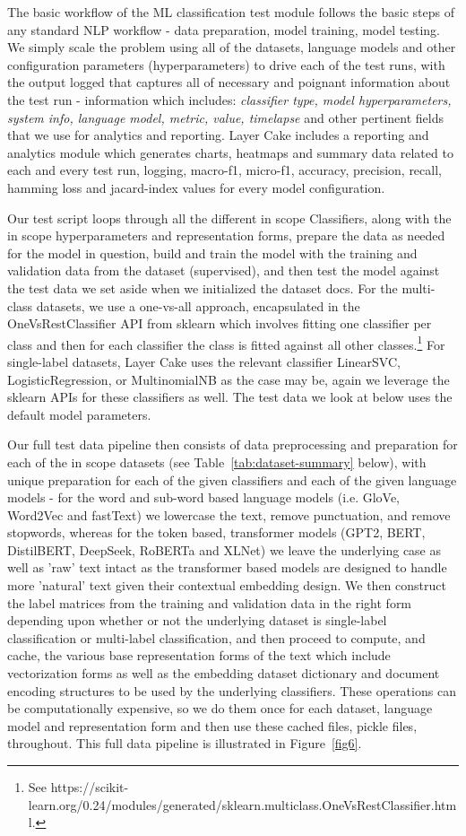 \documentclass[final]{clv2025-revised}
\begin{document}
The basic workflow of the ML classification test module follows the basic steps of any standard NLP workflow - data preparation, model training, model testing. We simply scale the problem using all of the datasets, language models and other configuration parameters (hyperparameters) to drive each of the test runs, with the output logged that captures all of necessary and poignant information about the test run - information which includes: \textit{classifier type, model hyperparameters, system info, language model, metric, value, timelapse} and other pertinent fields that we use for analytics and reporting. Layer Cake includes a reporting and analytics module which generates charts, heatmaps and summary data related to each and every test run, logging, macro-f1, micro-f1, accuracy, precision, recall, hamming loss and jacard-index values for every model configuration. 

Our test script loops through all the different in scope Classifiers, along with the in scope hyperparameters and representation forms, prepare the data as needed for the model in question, build and train the model with the training and validation data from the dataset (supervised), and then test the model against the test data we set aside when we initialized the dataset docs. For the multi-class datasets, we use a one-vs-all approach, encapsulated in the OneVsRestClassifier API from sklearn which involves fitting one classifier per class and then for each classifier the class is fitted against all other classes.\footnote{See https://scikit-learn.org/0.24/modules/generated/sklearn.multiclass.OneVsRestClassifier.html.}  For single-label datasets, Layer Cake uses the relevant classifier LinearSVC, LogisticRegression, or MultinomialNB as the case may be, again we leverage the sklearn APIs for these classifiers as well. The test data we look at below uses the default model parameters.

Our full test data pipeline then consists of data preprocessing and preparation for each of the in scope datasets (see Table~\ref{tab:dataset-summary} below), with unique preparation for each of the given classifiers and each of the given language models - for the word and sub-word based language models (i.e. GloVe, Word2Vec and fastText) we lowercase the text, remove punctuation, and remove stopwords, whereas for the token based, transformer models (GPT2, BERT, DistilBERT, DeepSeek, RoBERTa and XLNet) we leave the underlying case as well as 'raw' text intact as the transformer based models are designed to handle more 'natural' text given their contextual embedding design. We then construct the label matrices from the training and validation data in the right form depending upon whether or not the underlying dataset is single-label classification or multi-label classification, and then proceed to compute, and cache, the various base representation forms of the text which include vectorization forms as well as the embedding dataset dictionary and document encoding structures to be used by the underlying classifiers. These operations can be computationally expensive, so we do them once for each dataset, language model and representation form and then use these cached files, pickle files, throughout. This full data pipeline is illustrated in Figure~\ref{fig6}.
\end{document}
